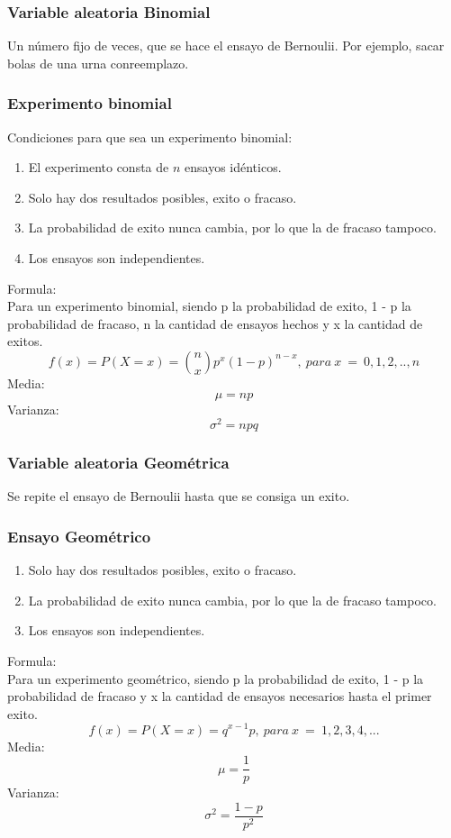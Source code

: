 \documentclass{article}
\begin{document}
\subsubsection{Variable aleatoria Binomial}
Un número fijo de veces, que se hace el ensayo de Bernoulii. Por ejemplo, sacar bolas de una urna conreemplazo.\\

\subsubsection*{Experimento binomial}
Condiciones para que sea un experimento binomial:\\
\begin{enumerate}
    \item El experimento consta de $n$ ensayos idénticos.
    \item Solo hay dos resultados posibles, exito o fracaso.
    \item La probabilidad de exito nunca cambia, por lo que la de fracaso tampoco.
    \item Los ensayos son independientes.
\end{enumerate}
Formula: \\
Para un experimento binomial, siendo p la probabilidad de exito, 1 - p la probabilidad de fracaso, n la cantidad de ensayos hechos y x la cantidad de exitos.\\
\[ f(x)=P(X=x)={n\choose x}p^{x}(1-p)^{n-x},\ para\ x\ =\ 0,1,2,..,n \]
Media:\\
\[\mu = np\]
Varianza:\\
\[\sigma^{2}=npq\]

\subsubsection{Variable aleatoria Geométrica}
Se repite el ensayo de Bernoulii hasta que se consiga un exito.\\

\subsubsection*{Ensayo Geométrico}
\begin{enumerate}
    \item Solo hay dos resultados posibles, exito o fracaso.
    \item La probabilidad de exito nunca cambia, por lo que la de fracaso tampoco.
    \item Los ensayos son independientes.
\end{enumerate}
Formula:\\
Para un experimento geométrico, siendo p la probabilidad de exito, 1 - p la probabilidad de fracaso y x la cantidad de ensayos necesarios hasta el primer exito.\\
\[ f(x)=P(X=x)=q^{x-1}p,\ para\ x\ =\ 1,2,3,4, ... \]
Media:\\
\[\mu=\frac{1}{p}\]
Varianza:
\[\sigma^{2}=\frac{1-p}{p^{2}}\]
\end{document}
